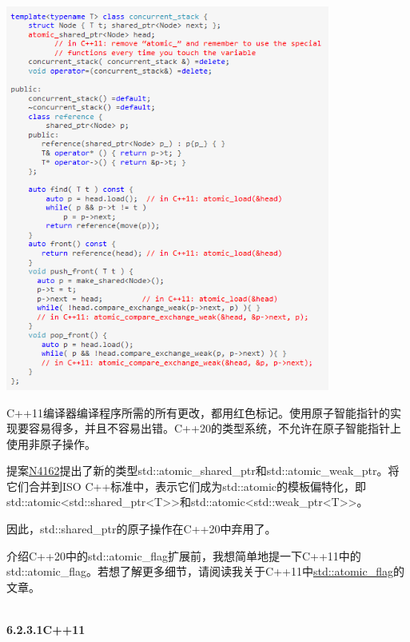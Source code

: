 \begin{center}
\includegraphics[width=0.8\textwidth]{content/3/chapter6/images/11.png} \\
\end{center}

C++11编译器编译程序所需的所有更改，都用红色标记。使用原子智能指针的实现要容易得多，并且不容易出错。C++20的类型系统，不允许在原子智能指针上使用非原子操作。

提案\href{http://wg21.link/n4162}{N4162}提出了新的类型std::atomic\_shared\_ptr和std::atomic\_weak\_ptr。将它们合并到ISO C++标准中，表示它们成为std::atomic的模板偏特化，即std::atomic<std::shared\_ptr<T>{}>和std::atomic<std::weak\_ptr<T>{}>。

因此，std::shared\_ptr的原子操作在C++20中弃用了。


介绍C++20中的std::atomic\_flag扩展前，我想简单地提一下C++11中的std::atomic\_flag。若想了解更多细节，请阅读我关于C++11中\href{https://www.modernescpp.com/index.php/the-atomic-flag}{std::atomic\_flag}的文章。

\hspace*{\fill} \\ %
\noindent
\textbf{6.2.3.1\hspace{0.2cm}C++11}


